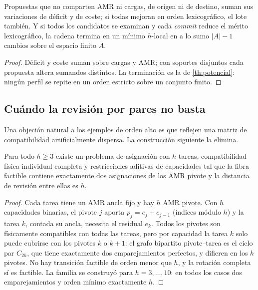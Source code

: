 \begin{proposicion}
\label{pr:composicion-disjunta}
Propuestas que no comparten AMR ni cargas, de origen ni de destino, suman sus
variaciones de déficit y de coste; si todas mejoran en orden lexicográfico, el
lote también. Y si todos los candidatos se examinan y cada \emph{commit}
reduce el mérito lexicográfico, la cadena termina en un mínimo $h$-local en a
lo sumo $|A|-1$ cambios sobre el espacio finito $A$.
\end{proposicion}

\begin{proof}
Déficit y coste suman sobre cargas y AMR; con soportes disjuntos cada
propuesta altera sumandos distintos. La terminación es la de
\cref{th:potencial}: ningún perfil se repite en un orden estricto sobre un
conjunto finito.
\end{proof}

\subsection{Cuándo la revisión por pares no basta}

Una objeción natural a los ejemplos de orden alto es que reflejen una matriz
de compatibilidad artificialmente dispersa. La construcción siguiente la
elimina.

\begin{teorema}
\label{th:compatibilidad-completa}
Para todo $h\ge3$ existe un problema de asignación con $h$ tareas,
compatibilidad física individual completa y restricciones aditivas de
capacidades tal que la fibra factible contiene exactamente dos asignaciones de
los AMR pivote y la distancia de revisión entre ellas es $h$.
\end{teorema}

\begin{proof}
Cada tarea tiene un AMR ancla fijo y hay $h$ AMR pivote. Con $h$ capacidades
binarias, el pivote $j$ aporta $p_j=e_j+e_{j-1}$ (índices módulo $h$) y la
tarea $k$, contada su ancla, necesita el residual $e_k$. Todos los pivotes son
físicamente compatibles con todas las tareas, pero por capacidad la tarea $k$
solo puede cubrirse con los pivotes $k$ o $k+1$: el grafo bipartito
pivote--tarea es el ciclo par $C_{2h}$, que tiene exactamente dos
emparejamientos perfectos, y difieren en los $h$ pivotes. No hay transición
factible de orden menor que $h$, y la rotación completa sí es factible. La
familia se construyó para $h=3,\dots,10$: en todos los casos dos
emparejamientos y orden mínimo exactamente $h$.
\end{proof}

